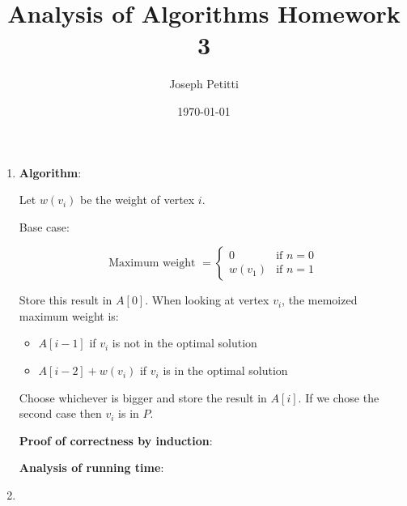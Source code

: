 \documentclass[a4paper, 10pt]{article}
\title{Analysis of Algorithms Homework 3}
\author{Joseph Petitti}
\date{\today}
\begin{document}
\maketitle

\begin{enumerate}
	\item \textbf{Algorithm}:

		Let $w(v_i)$ be the weight of vertex $i$.

		Base case:

		\[ \textrm{Maximum weight } =
		\begin{cases}
			0 & \textrm{if } n = 0 \\
			w(v_1) & \textrm{if } n = 1
		\end{cases} \]

		Store this result in $A[0]$. When looking at vertex $v_i$, the memoized
		maximum weight is:

		\begin{itemize}
			\item $A[i - 1]$ if $v_i$ is not in the optimal solution
			\item $A[i -2] + w(v_i)$ if $v_i$ is in the optimal solution
		\end{itemize}

		Choose whichever is bigger and store the result in $A[i]$. If we chose
		the second case then $v_i$ is in $P$.

		\textbf{Proof of correctness by induction}:

		\textbf{Analysis of running time}:

	\item

\end{enumerate}
\end{document}

